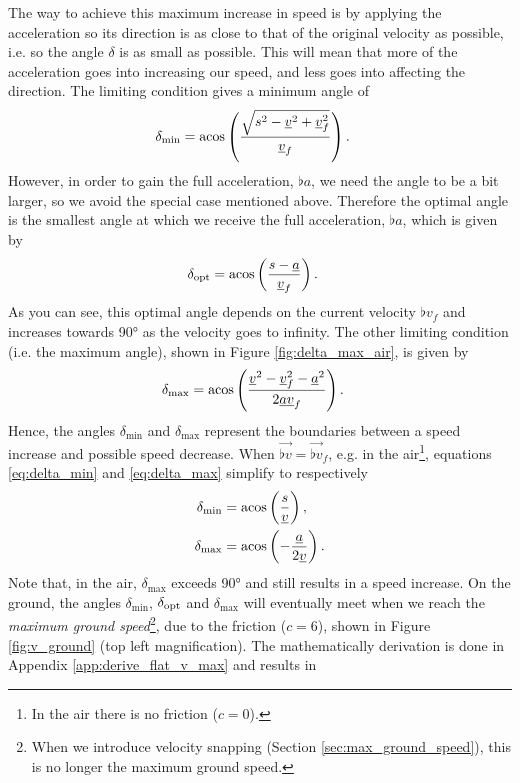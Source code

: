 The way to achieve this maximum increase in speed is by applying the acceleration so its direction is as close to that of the original velocity as possible, i.e. so the angle $\delta$ is as small as possible. This will mean that more of the acceleration goes into increasing our speed, and less goes into affecting the direction. The limiting condition gives a minimum angle of
\begin{align}
\label{eq:delta_min}
\delta_{\min} &= \acos\left(\frac{\sqrt{s^2 - \flat{v}^2 + \flat{v}_f^2}}{\flat{v}_f} \right).
\end{align}
However, in order to gain the full acceleration, $\flat{a}$, we need the angle to be a bit larger, so we avoid the special case mentioned above. Therefore the optimal angle is the smallest angle at which we receive the full acceleration, $\flat{a}$, which is given by
\begin{align}
\label{eq:delta_opt}
\delta_{\opt} &= \acos\left( \frac{s - \flat{a}}{\flat{v}_f} \right).
\end{align}
As you can see, this optimal angle depends on the current velocity $\flat{v}_f$ and increases towards \ang{90} as the velocity goes to infinity. The other limiting condition (i.e. the maximum angle), shown in Figure \ref{fig:delta_max_air}, is given by
\begin{align}
\label{eq:delta_max}
\delta_{\max} &= \acos\left( \frac{\flat{v}^2 - \flat{v}_f^2 - \flat{a}^2}{2 \flat{a} \flat{v}_f} \right).
\end{align}
Hence, the angles $\delta_{\min}$ and $\delta_{\max}$ represent the boundaries between a speed increase and possible speed decrease. When $\vec{\flat{v}} = \vec{\flat{v}}_f$, e.g. in the air\footnote{In the air there is no friction ($c = 0$).}, equations \eqref{eq:delta_min} and \eqref{eq:delta_max} simplify to respectively
\begin{align}
\label{eq:delta_min_vf}
\delta_{\min} &= \acos\left(\frac{s}{\flat{v}} \right),\\
\label{eq:delta_max_vf}
\delta_{\max} &= \acos\left(-\frac{\flat{a}}{2\flat{v}} \right).
\end{align}
Note that, in the air, $\delta_{\max}$ exceeds \ang{90} and still results in a speed increase. On the ground, the angles $\delta_{\min}$, $\delta_{\operatorname{opt}}$ and $\delta_{\max}$ will eventually meet when we reach the \emph{maximum ground speed}\footnote{When we introduce velocity snapping (Section \ref{sec:max_ground_speed}), this is no longer the maximum ground speed.}, due to the friction ($c = 6$), shown in Figure \ref{fig:v_ground} (top left magnification). The mathematically derivation is done in Appendix \ref{app:derive_flat_v_max} and results in
